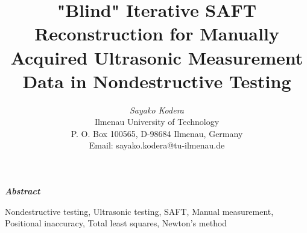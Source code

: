 \documentclass[10pt,twocolumn,a4paper,conference]{IEEEtran}
\begin{document}
\title{\bf "Blind" Iterative SAFT Reconstruction for Manually Acquired Ultrasonic Measurement Data in Nondestructive Testing}

\author{
\textit{Sayako Kodera}\\
Ilmenau University of Technology\\
P. O. Box 100565, D-98684 Ilmenau, Germany \\
Email: sayako.kodera@tu-ilmenau.de
} 

\maketitle

{\bf {\bf \slshape Abstract } %
  
}


\smallskip

\begin{IEEEkeywords}
   Nondestructive testing, Ultrasonic testing, SAFT, Manual measurement, Positional inaccuracy, Total least squares, Newton's method
\end{IEEEkeywords}

\end{document}
